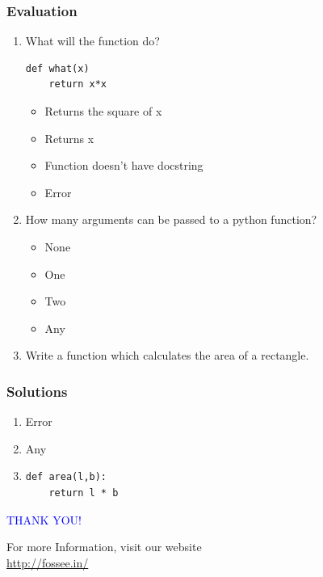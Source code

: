\documentclass[presentation]{beamer}
\begin{document}
\begin{frame}[fragile]
\frametitle{Evaluation}
\label{sec-17}


\begin{enumerate}
\item What will the function do?
\lstset{language=Python}
\begin{lstlisting}
def what(x)
    return x*x
\end{lstlisting}
\begin{itemize}
\item Returns the square of x
\item Returns x
\item Function doesn't have docstring
\item Error
\end{itemize}
\vspace{3pt}
\item How many arguments can be passed to a python function?
\begin{itemize}
\item None
\item One
\item Two
\item Any
\end{itemize}
\vspace{3pt}
\item Write a function which calculates the area of a rectangle.
\end{enumerate}
\end{frame}
\begin{frame}[fragile]
\frametitle{Solutions}
\label{sec-18}


\begin{enumerate}
\item Error
\vspace{16pt}
\item Any
\vspace{12pt}
\item \lstset{language=Python}
\begin{lstlisting}
def area(l,b):
    return l * b
\end{lstlisting}
\end{enumerate}
\end{frame}
\begin{frame}

  \begin{block}{}
  \begin{center}
  \textcolor{blue}{\Large THANK YOU!} 
  \end{center}
  \end{block}
\begin{block}{}
  \begin{center}
    For more Information, visit our website\\
    \url{http://fossee.in/}
  \end{center}  
  \end{block}
\end{frame}
\end{document}
